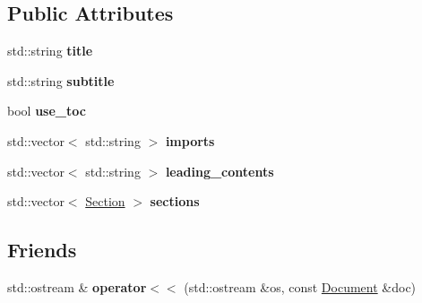 \subsection*{Public Attributes}
\begin{DoxyCompactItemize}
\item 
\hypertarget{classlatex_1_1doc_1_1Document_a7d2471c10cb6acd788221f9a483239c4}{std\-::string {\bfseries title}}\label{classlatex_1_1doc_1_1Document_a7d2471c10cb6acd788221f9a483239c4}

\item 
\hypertarget{classlatex_1_1doc_1_1Document_ac914852ad0ef4b38464af7d8428ee5c4}{std\-::string {\bfseries subtitle}}\label{classlatex_1_1doc_1_1Document_ac914852ad0ef4b38464af7d8428ee5c4}

\item 
\hypertarget{classlatex_1_1doc_1_1Document_a066a6a230145e1009ab2ea80979b35e9}{bool {\bfseries use\-\_\-toc}}\label{classlatex_1_1doc_1_1Document_a066a6a230145e1009ab2ea80979b35e9}

\item 
\hypertarget{classlatex_1_1doc_1_1Document_af67d077d41fdafccad5fe92c4df6467c}{std\-::vector$<$ std\-::string $>$ {\bfseries imports}}\label{classlatex_1_1doc_1_1Document_af67d077d41fdafccad5fe92c4df6467c}

\item 
\hypertarget{classlatex_1_1doc_1_1Document_ac35b8eb616dc2926e4d9b6bc3fc8d2b1}{std\-::vector$<$ std\-::string $>$ {\bfseries leading\-\_\-contents}}\label{classlatex_1_1doc_1_1Document_ac35b8eb616dc2926e4d9b6bc3fc8d2b1}

\item 
\hypertarget{classlatex_1_1doc_1_1Document_ae3bb46001f49ca9a949b7edc1a8f1c75}{std\-::vector$<$ \hyperlink{classlatex_1_1doc_1_1Section}{Section} $>$ {\bfseries sections}}\label{classlatex_1_1doc_1_1Document_ae3bb46001f49ca9a949b7edc1a8f1c75}

\end{DoxyCompactItemize}
\subsection*{Friends}
\begin{DoxyCompactItemize}
\item 
\hypertarget{classlatex_1_1doc_1_1Document_a278308e5ad27667f48b2daf57dd1b254}{std\-::ostream \& {\bfseries operator$<$$<$} (std\-::ostream \&os, const \hyperlink{classlatex_1_1doc_1_1Document}{Document} \&doc)}\label{classlatex_1_1doc_1_1Document_a278308e5ad27667f48b2daf57dd1b254}

\end{DoxyCompactItemize}


